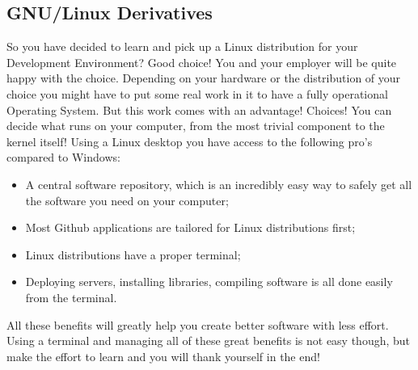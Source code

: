 \documentclass[paper=a4, fontsize=10pt]{scrartcl} %
\numberwithin{equation}{section} %
\numberwithin{figure}{section} %
\numberwithin{table}{section} %
\begin{document}
\subsection{GNU/Linux Derivatives}
So you have decided to learn and pick up a Linux distribution for your
Development Environment? Good choice! You and your employer will be quite happy
with the choice. Depending on your hardware or the distribution of your choice
you might have to put some real work in it to have a fully operational Operating
System. But this work comes with an advantage! Choices! You can decide what
runs on your computer, from the most trivial component to the kernel itself!
Using a Linux desktop you have access to the following pro's compared to
Windows:

			\begin{itemize}
                \item A central software repository,
which is an incredibly easy way to safely get all the software you need on your
computer;
			    \item Most Github applications are tailored for Linux
                    distributions first;
                \item Linux distributions have a proper terminal;
                \item Deploying servers, installing libraries, compiling
                    software is all done easily from the terminal.
			\end{itemize}

All these benefits will greatly help you create better software with less
effort. Using a terminal and managing all of these
great benefits is not easy though, but make the effort to learn and you will thank
yourself in the end! 
\end{document}
